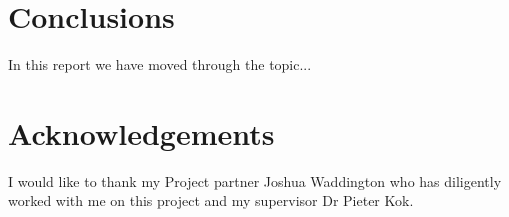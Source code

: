 \documentclass{article}
\numberwithin{equation}{section} %
\begin{document}
  

\section{Conclusions}
In this report we have moved through the topic...

\section{Acknowledgements}
I would like to thank my Project partner Joshua Waddington who has diligently worked with me on this project and my supervisor Dr Pieter Kok. 


%


\end{document}
